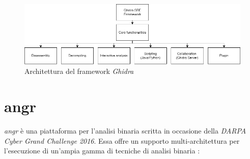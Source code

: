 \documentclass[../main.tex]{subfiles}
\begin{document}
\begin{figure}[H]
    \centering
    \includegraphics[width = \textwidth]{../images/ghidra.png}
    \caption{Architettura del framework \textit{Ghidra}}
\end{figure}
\section{angr}
\textit{angr} \cite{angr_introductory_paper} è una piattaforma per l'analisi binaria scritta in occasione della \textit{DARPA Cyber Grand Challenge 2016}.
Essa offre un supporto multi-architettura per l'esecuzione di un'ampia gamma di tecniche di analisi binaria \cite{angr_introductory_paper}:
\end{document}
